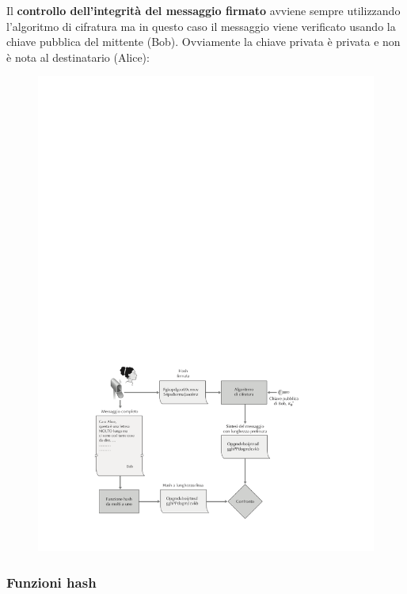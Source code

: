 \documentclass[a4paper]{article}
\begin{document}
	Il \textbf{controllo dell'integrità del messaggio firmato} avviene sempre utilizzando l'algoritmo di cifratura ma in questo caso il messaggio viene verificato usando la chiave pubblica del mittente (Bob). Ovviamente la chiave privata è privata e non è nota al destinatario (Alice):
	\begin{figure}[!htp]
		\centering
		\includegraphics[width=\textwidth]{img/int-aut_e_autor/controllo-integrita.pdf}
	\end{figure}\newpage
	
	\subsubsection{Funzioni hash}
	
\end{document}
